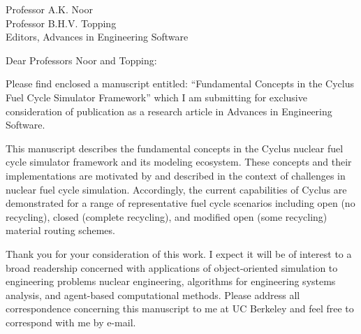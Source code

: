 \documentclass[11pt]{letter} %
\begin{document}


\begin{letter}{Professor A.K. Noor\\
Professor B.H.V. Topping\\
Editors, Advances in Engineering Software}

\address{Kathryn D. Huff\\
2150 Shattuck Ave.\\
Suite 230\\
Berkeley, CA 94720}



\opening{Dear Professors Noor and Topping:}

Please find enclosed a manuscript entitled: ``Fundamental Concepts in the 
Cyclus Fuel Cycle Simulator Framework'' which I am submitting for exclusive 
consideration of publication as a research article in Advances in Engineering 
Software.

This manuscript describes the fundamental concepts in the Cyclus nuclear fuel 
cycle simulator framework and its modeling ecosystem. These concepts and their 
implementations are motivated by and described in the context of challenges in 
nuclear fuel cycle simulation. Accordingly, the current capabilities of Cyclus 
are demonstrated for a range of representative fuel cycle scenarios including 
open (no recycling), closed (complete recycling), and modified open (some 
recycling) material routing schemes.


Thank you for your consideration of this work. I expect it will be of interest
to a broad readership concerned with applications of object-oriented simulation 
to engineering problems nuclear engineering, algorithms for engineering systems 
analysis, and agent-based computational methods. Please address all 
correspondence concerning this manuscript to me at UC Berkeley and feel free to 
correspond with me by e-mail.


\end{letter}
\end{document}
